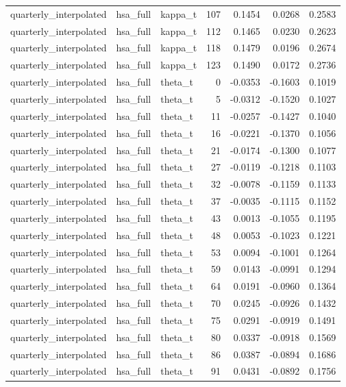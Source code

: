 \begin{tabular}{lllrrrr}
quarterly\_interpolated & hsa\_full & kappa\_t & 107 & 0.1454 & 0.0268 & 0.2583 \\
quarterly\_interpolated & hsa\_full & kappa\_t & 112 & 0.1465 & 0.0230 & 0.2623 \\
quarterly\_interpolated & hsa\_full & kappa\_t & 118 & 0.1479 & 0.0196 & 0.2674 \\
quarterly\_interpolated & hsa\_full & kappa\_t & 123 & 0.1490 & 0.0172 & 0.2736 \\
quarterly\_interpolated & hsa\_full & theta\_t & 0 & -0.0353 & -0.1603 & 0.1019 \\
quarterly\_interpolated & hsa\_full & theta\_t & 5 & -0.0312 & -0.1520 & 0.1027 \\
quarterly\_interpolated & hsa\_full & theta\_t & 11 & -0.0257 & -0.1427 & 0.1040 \\
quarterly\_interpolated & hsa\_full & theta\_t & 16 & -0.0221 & -0.1370 & 0.1056 \\
quarterly\_interpolated & hsa\_full & theta\_t & 21 & -0.0174 & -0.1300 & 0.1077 \\
quarterly\_interpolated & hsa\_full & theta\_t & 27 & -0.0119 & -0.1218 & 0.1103 \\
quarterly\_interpolated & hsa\_full & theta\_t & 32 & -0.0078 & -0.1159 & 0.1133 \\
quarterly\_interpolated & hsa\_full & theta\_t & 37 & -0.0035 & -0.1115 & 0.1152 \\
quarterly\_interpolated & hsa\_full & theta\_t & 43 & 0.0013 & -0.1055 & 0.1195 \\
quarterly\_interpolated & hsa\_full & theta\_t & 48 & 0.0053 & -0.1023 & 0.1221 \\
quarterly\_interpolated & hsa\_full & theta\_t & 53 & 0.0094 & -0.1001 & 0.1264 \\
quarterly\_interpolated & hsa\_full & theta\_t & 59 & 0.0143 & -0.0991 & 0.1294 \\
quarterly\_interpolated & hsa\_full & theta\_t & 64 & 0.0191 & -0.0960 & 0.1364 \\
quarterly\_interpolated & hsa\_full & theta\_t & 70 & 0.0245 & -0.0926 & 0.1432 \\
quarterly\_interpolated & hsa\_full & theta\_t & 75 & 0.0291 & -0.0919 & 0.1491 \\
quarterly\_interpolated & hsa\_full & theta\_t & 80 & 0.0337 & -0.0918 & 0.1569 \\
quarterly\_interpolated & hsa\_full & theta\_t & 86 & 0.0387 & -0.0894 & 0.1686 \\
quarterly\_interpolated & hsa\_full & theta\_t & 91 & 0.0431 & -0.0892 & 0.1756 \\

\end{tabular}
